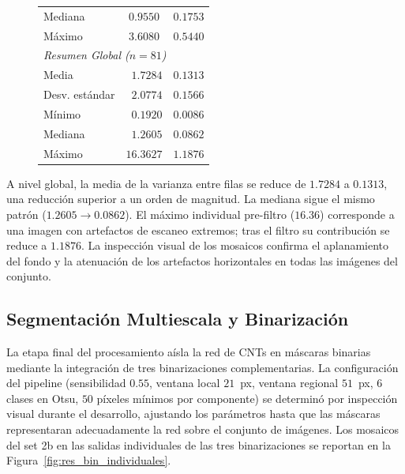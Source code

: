 \begin{figure}[H]
\begin{minipage}[t]{0.49\textwidth}
\begin{tabular}{lcc}
\quad Mediana         & $0.9550$  & $0.1753$ \\
\quad Máximo          & $3.6080$  & $0.5440$ \\
\midrule
\multicolumn{3}{l}{\textit{Resumen Global ($n=81$)}} \\
\quad Media           & $\phantom{0}1.7284$  & $0.1313$ \\
\quad Desv. estándar  & $\phantom{0}2.0774$  & $0.1566$ \\
\quad Mínimo          & $\phantom{0}0.1920$  & $0.0086$ \\
\quad Mediana         & $\phantom{0}1.2605$  & $0.0862$ \\
\quad Máximo          & $16.3627$            & $1.1876$ \\
\bottomrule
\end{tabular}
\end{minipage}
\end{figure}

A nivel global, la media de la varianza entre filas se reduce de $1.7284$ a $0.1313$, una reducción superior a un orden de magnitud. La mediana sigue el mismo patrón ($1.2605 \to 0.0862$). El máximo individual pre-filtro ($16.36$) corresponde a una imagen con artefactos de escaneo extremos; tras el filtro su contribución se reduce a $1.1876$. La inspección visual de los mosaicos confirma el aplanamiento del fondo y la atenuación de los artefactos horizontales en todas las imágenes del conjunto.




\subsection{Segmentación Multiescala y Binarización}
 
La etapa final del procesamiento aísla la red de CNTs en máscaras binarias mediante la integración de tres binarizaciones complementarias. La configuración del pipeline (sensibilidad $0.55$, ventana local $21$~px, ventana regional $51$~px, $6$ clases en Otsu, $50$ píxeles mínimos por componente) se determinó por inspección visual durante el desarrollo, ajustando los parámetros hasta que las máscaras representaran adecuadamente la red sobre el conjunto de imágenes. Los mosaicos del set 2b en las salidas individuales de las tres binarizaciones se reportan en la Figura~\ref{fig:res_bin_individuales}.


